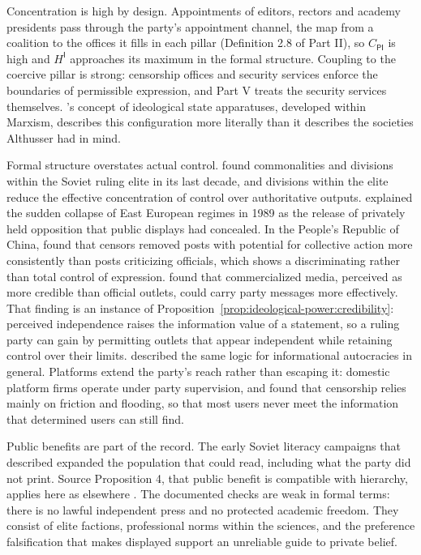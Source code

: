 \documentclass[11pt,letterpaper]{article}
\theoremstyle{definition}
\theoremstyle{remark}
\newcommand{\pP}{\mathsf{P}}
\newcommand{\pI}{\mathsf{I}}
\begin{document}
Concentration is high by design. Appointments of editors, rectors and academy presidents pass through the party's appointment channel, the map from a coalition to the offices it fills in each pillar (Definition 2.8 of Part II), so $C_{\pP\pI}$ is high and $H^{\pI}$ approaches its maximum in the formal structure. Coupling to the coercive pillar is strong: censorship offices and security services enforce the boundaries of permissible expression, and Part V treats the security services themselves. \citet{althusser1971}'s concept of ideological state apparatuses, developed within Marxism, describes this configuration more literally than it describes the societies Althusser had in mind.

Formal structure overstates actual control. \citet{lane1995} found commonalities and divisions within the Soviet ruling elite in its last decade, and divisions within the elite reduce the effective concentration of control over authoritative outputs. \citet{kuran1991} explained the sudden collapse of East European regimes in 1989 as the release of privately held opposition that public displays had concealed. In the People's Republic of China, \citet{king2013} found that censors removed posts with potential for collective action more consistently than posts criticizing officials, which shows a discriminating rather than total control of expression. \citet{stockmann2013} found that commercialized media, perceived as more credible than official outlets, could carry party messages more effectively. That finding is an instance of Proposition~\ref{prop:ideological-power:credibility}: perceived independence raises the information value of a statement, so a ruling party can gain by permitting outlets that appear independent while retaining control over their limits. \citet{guriev2019} described the same logic for informational autocracies in general. Platforms extend the party's reach rather than escaping it: domestic platform firms operate under party supervision, and \citet{roberts2018} found that censorship relies mainly on friction and flooding, so that most users never meet the information that determined users can still find.

Public benefits are part of the record. The early Soviet literacy campaigns that \citet{kenez1985} described expanded the population that could read, including what the party did not print. Source Proposition 4, that public benefit is compatible with hierarchy, applies here as elsewhere \citep{largo2026hbs}. The documented checks are weak in formal terms: there is no lawful independent press and no protected academic freedom. They consist of elite factions, professional norms within the sciences, and the preference falsification that makes displayed support an unreliable guide to private belief.
\end{document}
